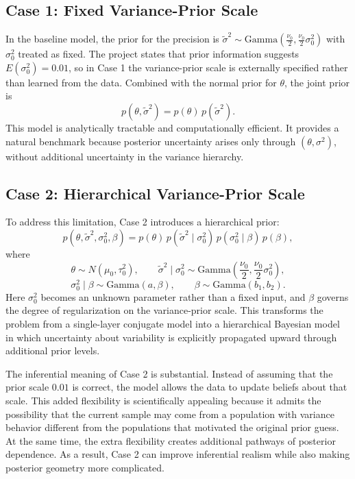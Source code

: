 \documentclass[11pt]{article}
\begin{document}
\subsection{Case 1: Fixed Variance-Prior Scale}

In the baseline model, the prior for the precision is $\tilde{\sigma}^2 \sim \mathrm{Gamma}\left(\frac{\nu_0}{2},\frac{\nu_0}{2}\sigma_0^2\right)$
with $\sigma_0^2$ treated as fixed. The project states that prior information suggests $E(\sigma_0^2)=0.01$,
so in Case 1 the variance-prior scale is externally specified rather than learned from the data. Combined with the normal prior for $\theta$, the joint prior is
\[
p(\theta,\tilde{\sigma}^2)=p(\theta)\,p(\tilde{\sigma}^2).
\]
This model is analytically tractable and computationally efficient. It provides a natural benchmark because posterior uncertainty arises only through $(\theta,\sigma^2)$, without additional uncertainty in the variance hierarchy.

\subsection{Case 2: Hierarchical Variance-Prior Scale}

To address this limitation, Case 2 introduces a hierarchical prior:
\[
p(\theta,\tilde{\sigma}^2,\sigma_0^2,\beta)
=
p(\theta)\,p(\tilde{\sigma}^2\mid \sigma_0^2)\,p(\sigma_0^2\mid \beta)\,p(\beta),
\]
where
\[
\theta \sim N(\mu_0,\tau_0^2), \qquad
\tilde{\sigma}^2 \mid \sigma_0^2 \sim \mathrm{Gamma}\left(\frac{\nu_0}{2},\frac{\nu_0}{2}\sigma_0^2\right),
\]
\[
\sigma_0^2 \mid \beta \sim \mathrm{Gamma}(a,\beta), \qquad
\beta \sim \mathrm{Gamma}(b_1,b_2).
\]
Here $\sigma_0^2$ becomes an unknown parameter rather than a fixed input, and $\beta$ governs the degree of regularization on the variance-prior scale. This transforms the problem from a single-layer conjugate model into a hierarchical Bayesian model in which uncertainty about variability is explicitly propagated upward through additional prior levels.

The inferential meaning of Case 2 is substantial. Instead of assuming that the prior scale $0.01$ is correct, the model allows the data to update beliefs about that scale. This added flexibility is scientifically appealing because it admits the possibility that the current sample may come from a population with variance behavior different from the populations that motivated the original prior guess. At the same time, the extra flexibility creates additional pathways of posterior dependence. As a result, Case 2 can improve inferential realism while also making posterior geometry more complicated.
\end{document}
